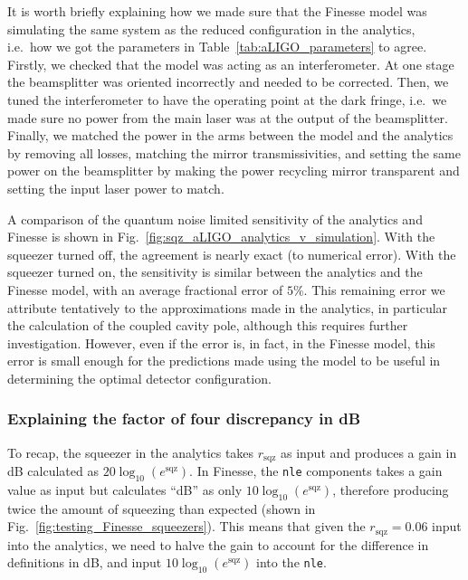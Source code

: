 \documentclass[aps,pra,superscriptaddress,reprint,nofootinbib]{revtex4-1}
\newcommand{\code}[1]{\texttt{#1}}
\begin{document}
It is worth briefly explaining how we made sure that the Finesse model was simulating the same system as the reduced configuration in the analytics, i.e.\ how we got the parameters in Table~\ref{tab:aLIGO_parameters} to agree. Firstly, we checked that the model was acting as an interferometer. At one stage the beamsplitter was oriented incorrectly and needed to be corrected. Then, we tuned the interferometer to have the operating point at the dark fringe, i.e.\ we made sure no power from the main laser was at the output of the beamsplitter. Finally, we matched the power in the arms between the model and the analytics by removing all losses, matching the mirror transmissivities, and setting the same power on the beamsplitter by making the power recycling mirror transparent and setting the input laser power to match.


A comparison of the quantum noise limited sensitivity of the analytics and Finesse is shown in Fig.~\ref{fig:sqz_aLIGO_analytics_v_simulation}. With the squeezer turned off, the agreement is nearly exact (to numerical error). With the squeezer turned on, the sensitivity is similar between the analytics and the Finesse model, with an average fractional error of $5\%$.
This remaining error we attribute tentatively to the approximations made in the analytics, in particular the calculation of the coupled cavity pole, although this requires further investigation. However, even if the error is, in fact, in the Finesse model, this error is small enough for the predictions made using the model to be useful in determining the optimal detector configuration.


\subsubsection{Explaining the factor of four discrepancy in dB}

To recap, the squeezer in the analytics takes $r_\mathrm{sqz}$ as input and produces a gain in dB calculated as $20 \log_{10}(e^\mathrm{sqz})$. In Finesse, the \code{nle} components takes a gain value as input but calculates “dB” as only $10 \log_{10}(e^\mathrm{sqz})$, therefore producing twice the amount of squeezing than expected (shown in Fig.~\ref{fig:testing_Finesse_squeezers}). This means that given the $r_\mathrm{sqz} = 0.06$ input into the analytics, we need to halve the gain to account for the difference in definitions in dB, and input $10 \log_{10}(e^\mathrm{sqz})$ into the \code{nle}.
\end{document}
